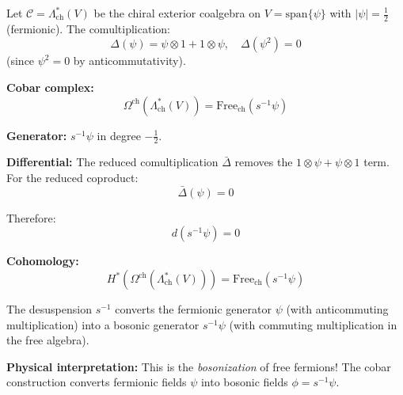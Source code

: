 \begin{example}\label{ex:cobar-fermion-complete}

Let $\mathcal{C} = \Lambda^*_{\text{ch}}(V)$ be the chiral exterior coalgebra on 
$V = \text{span}\{\psi\}$ with $|\psi| = \frac{1}{2}$ (fermionic). The comultiplication:
$$\Delta(\psi) = \psi \otimes 1 + 1 \otimes \psi, \quad \Delta(\psi^2) = 0$$
(since $\psi^2 = 0$ by anticommutativity).

\textbf{Cobar complex:}
$$\Omega^{\text{ch}}(\Lambda^*_{\text{ch}}(V)) = \text{Free}_{\text{ch}}(s^{-1}\psi)$$

\textbf{Generator:} $s^{-1}\psi$ in degree $-\frac{1}{2}$.

\textbf{Differential:}
The reduced comultiplication $\bar{\Delta}$ removes the $1 \otimes \psi + \psi \otimes 1$ 
term. For the reduced coproduct:
$$\bar{\Delta}(\psi) = 0$$

Therefore:
$$d(s^{-1}\psi) = 0$$

\textbf{Cohomology:}
$$H^*(\Omega^{\text{ch}}(\Lambda^*_{\text{ch}}(V))) = \text{Free}_{\text{ch}}(s^{-1}\psi)$$

The desuspension $s^{-1}$ converts the fermionic generator $\psi$ (with 
anticommuting multiplication) into a bosonic generator $s^{-1}\psi$ (with commuting 
multiplication in the free algebra).

\textbf{Physical interpretation:} This is the \emph{bosonization} of free fermions! 
The cobar construction converts fermionic fields $\psi$ into bosonic fields $\phi = s^{-1}\psi$.
\end{example}

